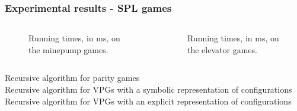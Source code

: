 \documentclass[aspectratio=169]{beamer}
\begin{document}
\begin{frame}[t]
\frametitle{Experimental results - SPL games}
\def\scalegraphs{0.6}
\begin{columns}[t]
	\begin{column}{0.5\textwidth}
		\begin{figure}[H]
			
			\caption{Running times, in ms, on the minepump games.}
			\label{fig:results_minepump}
		\end{figure}%
	\end{column}
	\begin{column}{0.5\textwidth}
		\begin{figure}[H]
			
			\caption{Running times, in ms, on the elevator games.}
			\label{fig:results_elevator}
		\end{figure}%
	\end{column}
\end{columns}
\small
{} Recursive algorithm for parity games\\
 Recursive algorithm for VPGs with a symbolic representation of configurations\\
 Recursive algorithm for VPGs with an explicit representation of configurations\\
\end{frame}

\end{document}
